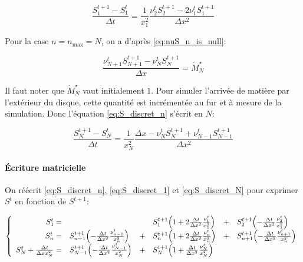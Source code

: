 \begin{equation}
  \label{eq:S_discret_1}
  \frac{S^{t+1}_1 - S^t_1}{\Delta t} = \frac{1}{x_1^2}\frac{\nu^t_{2}S^{t+1}_{2} - 2 \nu^t_1S^{t+1}_1}{\Delta x^2}
\end{equation}

Pour la case $n = n_\textrm{max} = N$, on a d'après \eqref{eq:nuS_n_is_null}:

\begin{equation}
  \frac{\nu^{t}_{N+1}S^{t+1}_{N+1} - \nu^{t}_NS^{t+1}_N}{\Delta x} = \dot{M}^\star_N
\end{equation}

Il faut noter que $\dot{M}^\star_N$ vaut initialement $1$. Pour simuler
l'arrivée de matière par l'extérieur du disque, cette quantité est incrémentée
au fur et à mesure de la simulation. Donc l'équation \eqref{eq:S_discret_n}
s'écrit en $N$:

\begin{equation}
  \label{eq:S_discret_N}
  \frac{S^{t+1}_N - S^t_N}{\Delta t} = \frac{1}{x_N^2}\frac{\Delta x - \nu^{t}_NS^{t+1}_N + \nu^{t}_{N-1}S^{t+1}_{N-1}}{\Delta x^2}
\end{equation}

\paragraph{Écriture matricielle}

On réécrit \eqref{eq:S_discret_n}, \eqref{eq:S_discret_1} et
\eqref{eq:S_discret_N} pour exprimer $S^t$ en fonction de $S^{t+1}$:

\begin{equation}
  \left\lbrace\begin{array}{r l c l c l }
    S^{t}_1 = &
               & &S_1^{t+1}\left(1 + 2\frac{\Delta t}{\Delta x^2}\frac{\nu_1^t}{x_1^2}\right)
               &+& S_{2}^{t+1}\left(-\frac{\Delta t}{\Delta x^2}\frac{\nu_{2}^t}{x_1^2}\right)\\
    S^{t}_n = &S_{n-1}^{t+1}\left(-\frac{\Delta t}{\Delta x^2}\frac{\nu_{n-1}^t}{x_n^2}\right)
               &+& S_n^{t+1}\left(1 + 2\frac{\Delta t}{\Delta x^2}\frac{\nu_n^t}{x_n^2}\right)
               &+& S_{n+1}^{t+1}\left(-\frac{\Delta t}{\Delta x^2}\frac{\nu_{n+1}^t}{x_n^2}\right)\\
    S^{t}_N + \frac{\Delta t}{\Delta x x_N^2} =
               &S^{t+1}_{N-1} \left(-\frac{\Delta t}{\Delta x^2}\frac{\nu_{N-1}^t}{x_N^2}\right)
               &+& S_N^{t+1} \left(1 + \frac{\Delta t}{\Delta x^2}\frac{\nu^t_N}{x_N^2}\right)
               & &
  \end{array}\right.
\end{equation}

